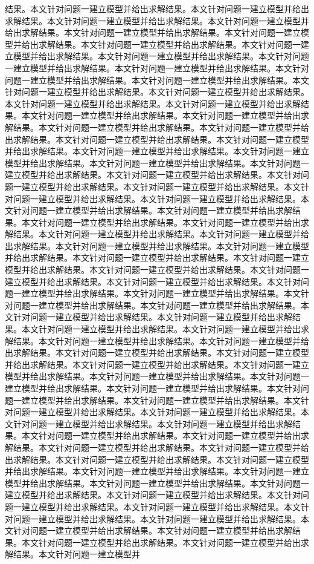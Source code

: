 结果。本文针对问题一建立模型并给出求解结果。本文针对问题一建立模型并给出求解结果。本文针对问题一建立模型并给出求解结果。本文针对问题一建立模型并给出求解结果。本文针对问题一建立模型并给出求解结果。本文针对问题一建立模型并给出求解结果。本文针对问题一建立模型并给出求解结果。本文针对问题一建立模型并给出求解结果。本文针对问题一建立模型并给出求解结果。本文针对问题一建立模型并给出求解结果。本文针对问题一建立模型并给出求解结果。本文针对问题一建立模型并给出求解结果。本文针对问题一建立模型并给出求解结果。本文针对问题一建立模型并给出求解结果。本文针对问题一建立模型并给出求解结果。本文针对问题一建立模型并给出求解结果。本文针对问题一建立模型并给出求解结果。本文针对问题一建立模型并给出求解结果。本文针对问题一建立模型并给出求解结果。本文针对问题一建立模型并给出求解结果。本文针对问题一建立模型并给出求解结果。本文针对问题一建立模型并给出求解结果。本文针对问题一建立模型并给出求解结果。本文针对问题一建立模型并给出求解结果。本文针对问题一建立模型并给出求解结果。本文针对问题一建立模型并给出求解结果。本文针对问题一建立模型并给出求解结果。本文针对问题一建立模型并给出求解结果。本文针对问题一建立模型并给出求解结果。本文针对问题一建立模型并给出求解结果。本文针对问题一建立模型并给出求解结果。本文针对问题一建立模型并给出求解结果。本文针对问题一建立模型并给出求解结果。本文针对问题一建立模型并给出求解结果。本文针对问题一建立模型并给出求解结果。本文针对问题一建立模型并给出求解结果。本文针对问题一建立模型并给出求解结果。本文针对问题一建立模型并给出求解结果。本文针对问题一建立模型并给出求解结果。本文针对问题一建立模型并给出求解结果。本文针对问题一建立模型并给出求解结果。本文针对问题一建立模型并给出求解结果。本文针对问题一建立模型并给出求解结果。本文针对问题一建立模型并给出求解结果。本文针对问题一建立模型并给出求解结果。本文针对问题一建立模型并给出求解结果。本文针对问题一建立模型并给出求解结果。本文针对问题一建立模型并给出求解结果。本文针对问题一建立模型并给出求解结果。本文针对问题一建立模型并给出求解结果。本文针对问题一建立模型并给出求解结果。本文针对问题一建立模型并给出求解结果。本文针对问题一建立模型并给出求解结果。本文针对问题一建立模型并给出求解结果。本文针对问题一建立模型并给出求解结果。本文针对问题一建立模型并给出求解结果。本文针对问题一建立模型并给出求解结果。本文针对问题一建立模型并给出求解结果。本文针对问题一建立模型并给出求解结果。本文针对问题一建立模型并给出求解结果。本文针对问题一建立模型并给出求解结果。本文针对问题一建立模型并给出求解结果。本文针对问题一建立模型并给出求解结果。本文针对问题一建立模型并给出求解结果。本文针对问题一建立模型并给出求解结果。本文针对问题一建立模型并给出求解结果。本文针对问题一建立模型并给出求解结果。本文针对问题一建立模型并给出求解结果。本文针对问题一建立模型并给出求解结果。本文针对问题一建立模型并给出求解结果。本文针对问题一建立模型并给出求解结果。本文针对问题一建立模型并给出求解结果。本文针对问题一建立模型并给出求解结果。本文针对问题一建立模型并给出求解结果。本文针对问题一建立模型并给出求解结果。本文针对问题一建立模型并给出求解结果。本文针对问题一建立模型并给出求解结果。本文针对问题一建立模型并给出求解结果。本文针对问题一建立模型并给出求解结果。本文针对问题一建立模型并给出求解结果。本文针对问题一建立模型并给出求解结果。本文针对问题一建立模型并给出求解结果。本文针对问题一建立模型并给出求解结果。本文针对问题一建立模型并给出求解结果。本文针对问题一建立模型并给出求解结果。本文针对问题一建立模型并给出求解结果。本文针对问题一建立模型并给出求解结果。本文针对问题一建立模型并